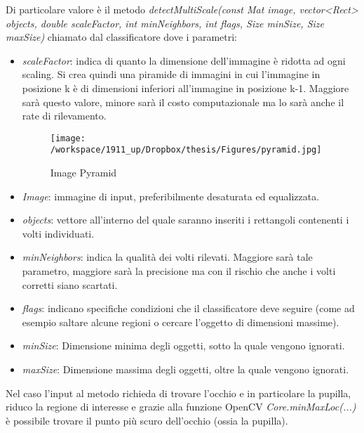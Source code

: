 Di particolare valore è il metodo \textit{detectMultiScale(const Mat image, vector<Rect> objects, double scaleFactor, int minNeighbors, int flags, Size minSize, Size maxSize)} chiamato dal classificatore dove i parametri:
 \begin{itemize}
 \item \textit{scaleFactor}: indica di quanto la dimensione dell'immagine è ridotta ad ogni scaling. Si crea quindi una piramide di immagini in cui l'immagine in posizione k è di dimensioni inferiori all'immagine in posizione k-1. Maggiore sarà questo valore, minore sarà il costo computazionale ma lo sarà anche il rate di rilevamento.

\begin{figure}[h]\centering  
\texttt{[image: /workspace/1911\_up/Dropbox/thesis/Figures/pyramid.jpg]}
\caption[Image Pyramid]{Image Pyramid}
\label{pic-a}
\end{figure} 

\item \textit{Image}: immagine di input, preferibilmente desaturata ed equalizzata.

\item \textit{objects}: vettore all'interno del quale saranno inseriti i rettangoli contenenti i volti individuati.

\item \textit{minNeighbors}: indica la qualità dei volti rilevati. Maggiore sarà tale parametro, maggiore sarà la precisione ma con il rischio che anche i volti corretti siano scartati.

\item \textit{flags}: indicano specifiche condizioni che il classificatore deve seguire (come ad esempio saltare alcune regioni o cercare l'oggetto di dimensioni massime).

\item \textit{minSize}: Dimensione minima degli oggetti, sotto la quale vengono ignorati.

\item \textit{maxSize}: Dimensione massima degli oggetti, oltre la quale vengono ignorati.
 
\end{itemize}
 
Nel caso l'input al metodo richieda di trovare l'occhio e in particolare la pupilla, riduco la regione di interesse e grazie alla funzione OpenCV \textit{Core.minMaxLoc(...)} è possibile trovare il punto più scuro dell'occhio (ossia la pupilla). 

